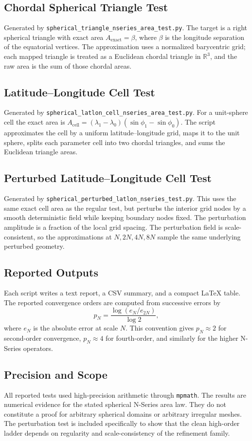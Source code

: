 \documentclass[11pt]{article}
\begin{document}
\subsection{Chordal Spherical Triangle Test}
Generated by \texttt{spherical\_triangle\_nseries\_area\_test.py}. The target is a right
spherical triangle with exact area $A_{\mathrm{exact}}=\beta$, where $\beta$ is the
longitude separation of the equatorial vertices. The approximation uses a normalized
barycentric grid; each mapped triangle is treated as a Euclidean chordal triangle in
$\mathbb{R}^3$, and the raw area is the sum of those chordal areas.

\subsection{Latitude--Longitude Cell Test}
Generated by \texttt{spherical\_latlon\_cell\_nseries\_area\_test.py}. For a unit-sphere
cell the exact area is $A_{\mathrm{cell}}=(\lambda_1-\lambda_0)(\sin\phi_1-\sin\phi_0)$.
The script approximates the cell by a uniform latitude--longitude grid, maps it to the unit
sphere, splits each parameter cell into two chordal triangles, and sums the Euclidean
triangle areas.

\subsection{Perturbed Latitude--Longitude Cell Test}
Generated by \texttt{spherical\_perturbed\_latlon\_nseries\_test.py}. This uses the same
exact cell area as the regular test, but perturbs the interior grid nodes by a smooth
deterministic field while keeping boundary nodes fixed. The perturbation amplitude is a
fraction of the local grid spacing. The perturbation field is scale-consistent, so the
approximations at $N,2N,4N,8N$ sample the same underlying perturbed geometry.

\subsection{Reported Outputs}
Each script writes a text report, a CSV summary, and a compact \LaTeX{} table. The reported
convergence orders are computed from successive errors by
\[
p_N = \frac{\log(e_N/e_{2N})}{\log 2},
\]
where $e_N$ is the absolute error at scale $N$. This convention gives $p_N\approx 2$ for
second-order convergence, $p_N\approx 4$ for fourth-order, and similarly for the higher
N-Series operators.

\subsection{Precision and Scope}
All reported tests used high-precision arithmetic through \texttt{mpmath}. The results are
numerical evidence for the stated spherical N-Series area law. They do not constitute a
proof for arbitrary spherical domains or arbitrary irregular meshes. The perturbation test
is included specifically to show that the clean high-order ladder depends on regularity and
scale-consistency of the refinement family.
\end{document}
